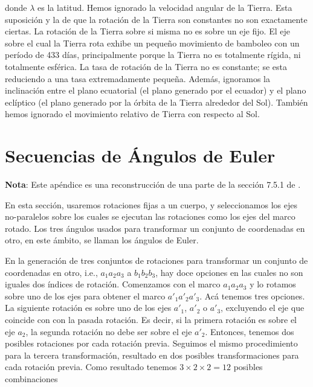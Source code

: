 \documentclass[a4paper,10pt]{article}
\numberwithin{equation}{section}
\begin{document}
donde $\lambda$ es la latitud. Hemos ignorado la velocidad angular de la Tierra. Esta 
suposición y la de que la rotación de la Tierra son constantes no son exactamente 
ciertas. La rotación de la Tierra sobre si misma no es sobre un eje fijo. El eje 
sobre el cual la Tierra rota exhibe un pequeño movimiento de bamboleo con un 
período de 433 días, principalmente porque la Tierra no es totalmente rígida, ni 
totalmente esférica. La tasa de rotación de la Tierra no es constante; se esta 
reduciendo a una tasa extremadamente pequeña. Además, ignoramos la inclinación 
entre el plano ecuatorial (el plano generado por el ecuador) y el plano eclíptico 
(el plano generado por la órbita de la Tierra alrededor del Sol). También hemos 
ignorado el movimiento relativo de Tierra con respecto al Sol.

\section{Secuencias de Ángulos de Euler}

\textbf{Nota}: Este apéndice es una reconstrucción de una parte de la sección 7.5.1 
de \cite{baruh}.

\vspace{.3cm}

En esta sección, usaremos rotaciones fijas a un cuerpo, y seleccionamos 
los ejes no-paralelos sobre los cuales se ejecutan las rotaciones como los ejes 
del marco rotado. Los tres ángulos usados para transformar un conjunto de coordenadas 
en otro, en este ámbito, se llaman los ángulos de Euler.

\vspace{.3cm}

En la generación de tres conjuntos de rotaciones para transformar un conjunto de 
coordenadas en otro, i.e., $a_1a_2a_3$ a $b_1b_2b_3$, hay doce opciones en las cuales 
no son iguales dos índices de rotación. Comenzamos con el marco $a_1a_2a_3$ y lo 
rotamos sobre uno de los ejes para obtener el marco $a'_1a'_2a'_3$. Acá tenemos 
tres opciones. La siguiente rotación es sobre uno de los ejes $a'_1$, $a'_2$ o $a'_3$, 
excluyendo el eje que coincide con con la pasada rotación. Es decir, si la primera 
rotación es sobre el eje $a_2$, la segunda rotación no debe ser sobre el eje $a'_2$. 
Entonces, tenemos dos posibles rotaciones por cada rotación previa. Seguimos el mismo 
procedimiento para la tercera transformación, resultado en dos posibles transformaciones 
para cada rotación previa. Como resultado tenemos $3 \times 2 \times 2 = 12$ posibles 
combinaciones 
\end{document}
